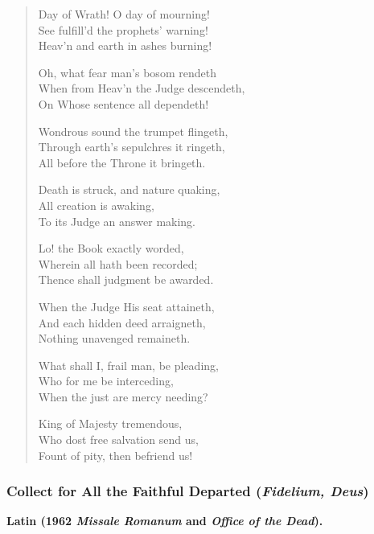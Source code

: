 \begin{quote}
Day of Wrath! O day of mourning!\\
See fulfill'd the prophets' warning!\\
Heav'n and earth in ashes burning!

Oh, what fear man's bosom rendeth\\
When from Heav'n the Judge descendeth,\\
On Whose sentence all dependeth!

Wondrous sound the trumpet flingeth,\\
Through earth's sepulchres it ringeth,\\
All before the Throne it bringeth.

Death is struck, and nature quaking,\\
All creation is awaking,\\
To its Judge an answer making.

Lo! the Book exactly worded,\\
Wherein all hath been recorded;\\
Thence shall judgment be awarded.

When the Judge His seat attaineth,\\
And each hidden deed arraigneth,\\
Nothing unavenged remaineth.

What shall I, frail man, be pleading,\\
Who for me be interceding,\\
When the just are mercy needing?

King of Majesty tremendous,\\
Who dost free salvation send us,\\
Fount of pity, then befriend us!
\end{quote}

\subsubsection*{Collect for All the Faithful Departed (\textit{Fidelium, Deus})}

\textbf{Latin (1962 \textit{Missale Romanum} and \textit{Office of the Dead}).}

